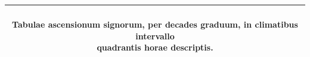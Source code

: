 \documentclass[11pt]{article}
\renewcommand{\arraystretch}{1.18}
\begin{document}
\begin{center}\setlength{\tabcolsep}{2.5pt}\renewcommand{\arraystretch}{1.0}\begin{tabular}{||c|c|>{\centering\arraybackslash}p{20mm}|>{\centering\arraybackslash}p{20mm}|>{\centering\arraybackslash}p{20mm}|>{\centering\arraybackslash}p{20mm}|>{\centering\arraybackslash}p{20mm}|>{\centering\arraybackslash}p{20mm}|>{\centering\arraybackslash}p{20mm}||}\hline
\multicolumn{9}{||c||}{\parbox{175mm}{\centering{}\\\textbf{Tabulae ascensionum signorum, per decades graduum, in climatibus intervallo}\\\textbf{quadrantis horae descriptis.}\vspace{1mm}}} \\ \hline

\end{tabular}
\end{center}
\end{document}

